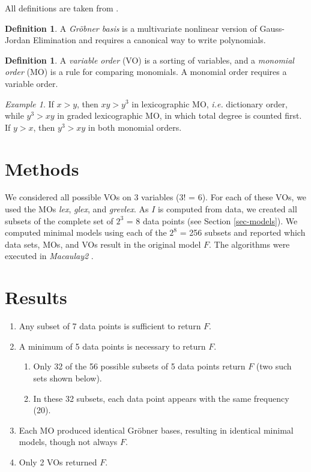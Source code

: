 \documentclass{amsart}
\theoremstyle{definition}
\newtheorem{defn}[thm]{Definition}
\theoremstyle{remark}
\theoremstyle{example}
\newtheorem{ex}[thm]{Example}
\theoremstyle{conjecture}
\numberwithin{equation}{section}
\begin{document}
All definitions are taken from \cite{cox}.

\begin{defn}
A \emph{Gr\"obner basis} is a multivariate nonlinear version of
Gauss-Jordan Elimination and requires a canonical way to write
polynomials.
\end{defn}

\begin{defn}
A \emph{variable order} (VO) is a sorting of variables, and a
\emph{monomial order}   (MO) is a rule for comparing monomials.  A
monomial order requires a variable order.
\end{defn}

\begin{ex}
If $x > y$, then $xy > y^3$  in lexicographic MO, \textit{i.e.}
dictionary order, while $y^3  > xy$ in graded lexicographic MO, in
which total degree is counted first.
    If $y > x$, then $y^3 > xy$ in both monomial orders.
\end{ex}

\section{Methods}
We considered all possible VOs on 3 variables (3! = 6). For each of
these VOs, we used the MOs \textit{lex}, \textit{glex}, and
\textit{grevlex}.  As $I$ is computed from data, we created all
subsets of the complete set of $2^3$ = 8 data points (see Section
\ref{sec-models}). We computed minimal models using each of the
$2^8$ = 256 subsets and reported which data sets, MOs, and VOs
result in the original model $F$.  The algorithms were executed in
\textit{Macaulay2} \cite{M2}.

\section{Results}

\begin{enumerate}
    \item Any subset of 7 data points is sufficient to return $F$.
    \item A minimum of 5 data points is necessary to return $F$.
    \begin{enumerate}
        \item Only 32 of the 56 possible subsets of 5 data points return $F$ (two such sets shown below).
        \item In these 32 subsets, each data point appears with  the same frequency (20).
    \end{enumerate}
    \item Each MO produced identical Gr\"obner bases, resulting in identical minimal models, though not always $F$.
    \item Only 2 VOs returned $F$.
\end{enumerate}
\end{document}
